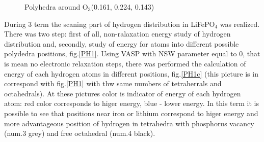 \begin{figure}[h]
\begin{minipage}[h]{0.5\linewidth}
\end{minipage}
\hfill
\begin{minipage}[h]{0.5\linewidth}
\end{minipage}
\caption{ Polyhedra around O$_3$(0.161, 0.224, 0.143) }
\label{PH3}
\end{figure}


\newpage


During 3 term the scaning part of hydrogen distribution in LiFePO$_4$ was realized. There was two step: first of all, non-ralaxation energy study of hydrogen distribution and, secondly, study of energy for atoms into different possible polydedra positions,  fig.\ref{PH1}. Using VASP with NSW parameter equal to 0, that is mean no electronic relaxation steps, there was performed the calculation of energy of each hydrogen atoms in different positions, fig.\ref{PH1c} (this picture is in correspond with  fig.\ref{PH1} with thw same numbers of tetraherrals and octahedrals). At these pictures color is indicator of energy of each hydrogen atom: red color corresponds to higer energy, blue - lower energy. In this term it is possible to see that positions near iron or lithium correspond to higer energy and more advantageous position of hydrogen in tetrahedra with phosphorus vacancy (num.3 grey) and free octahedral (num.4 black).

